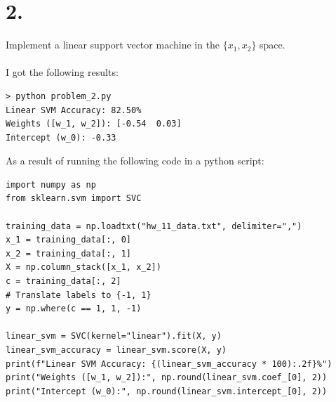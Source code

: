 \documentclass{article}
\begin{document}
{\Large 

\section*{2.}

Implement a linear support vector machine in the \(\{x_1, x_2\}\) space. \\ \\
I got the following results:
\begin{verbatim}
> python problem_2.py
Linear SVM Accuracy: 82.50%
Weights ([w_1, w_2]): [-0.54  0.03]
Intercept (w_0): -0.33
\end{verbatim}
As a result of running the following code in a python script:
\begin{verbatim}
import numpy as np
from sklearn.svm import SVC

training_data = np.loadtxt("hw_11_data.txt", delimiter=",")
x_1 = training_data[:, 0]
x_2 = training_data[:, 1]
X = np.column_stack([x_1, x_2])
c = training_data[:, 2]
# Translate labels to {-1, 1}
y = np.where(c == 1, 1, -1)

linear_svm = SVC(kernel="linear").fit(X, y)
linear_svm_accuracy = linear_svm.score(X, y)
print(f"Linear SVM Accuracy: {(linear_svm_accuracy * 100):.2f}%")
print("Weights ([w_1, w_2]):", np.round(linear_svm.coef_[0], 2))
print("Intercept (w_0):", np.round(linear_svm.intercept_[0], 2))
\end{verbatim}

}
\end{document}
